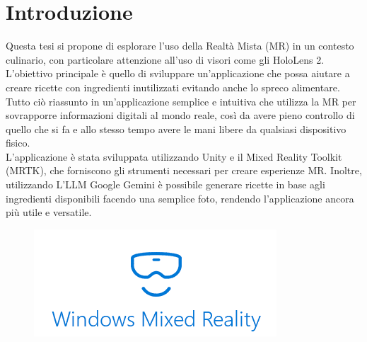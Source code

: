 \chapter{Introduzione}
\pagestyle{plain}
Questa tesi si propone di esplorare l'uso della Realtà Mista (MR) in un contesto culinario, con particolare attenzione all'uso di visori come gli HoloLens 2.\\ L'obiettivo principale è quello di sviluppare un'applicazione che possa aiutare a creare ricette con ingredienti inutilizzati evitando anche lo spreco alimentare. Tutto ciò riassunto in un'applicazione semplice e intuitiva che utilizza la MR per sovrapporre informazioni digitali al mondo reale, così da avere pieno controllo di quello che si fa e allo stesso tempo avere le mani libere da qualsiasi dispositivo fisico.\\
L'applicazione è stata sviluppata utilizzando Unity e il Mixed Reality Toolkit (MRTK), che forniscono gli strumenti necessari per creare esperienze MR. Inoltre, utilizzando L'LLM Google Gemini è possibile generare ricette in base agli ingredienti disponibili facendo una semplice foto, rendendo l'applicazione ancora più utile e versatile.
\begin{figure}[]
    \includegraphics{figures/chapter_1/Windows_Mixed_Reality_logo.png}
    \centering
\end{figure}


